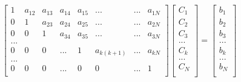 \documentclass[a1paper]{article}
\begin{document}
\begin{equation}
    \begin{bmatrix}
        1 & a_{12} & a_{13} &  a_{14} &  a_{15} & ...         & ... & a_{1N} \\
        0 &      1 & a_{23} &  a_{24} &  a_{25} & ...         & ... & a_{2N} \\
        0 &      0 &      1 &  a_{34} &  a_{35} & ...         & ... & a_{3N} \\
        ... \\
        0 &      0 &      0 & ...     &       1 & a_{k(k+1)}  & ... & a_{kN} \\
        ... \\
        0 &      0 &      0 & ...     &       0 &          0  & ... & 1 \\
    \end{bmatrix}
    \begin{bmatrix}
        C_1 \\ C_2 \\ C_3 \\ ... \\ C_k \\ ... \\ C_N \\
    \end{bmatrix}
    =
    \begin{bmatrix}
        b_1 \\ b_2 \\ b_3 \\ ... \\ b_k \\ ... \\ b_N \\
    \end{bmatrix}
\end{equation}
\end{document}
